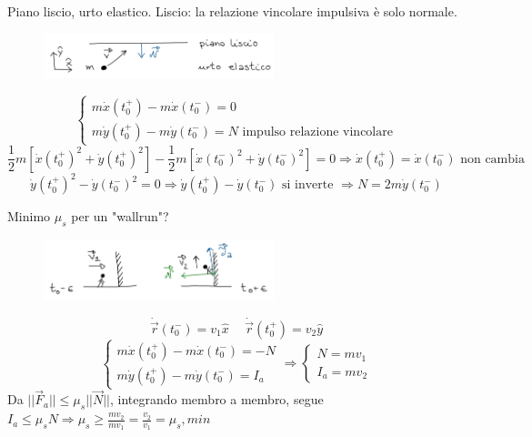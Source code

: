 \begin{example}
    Piano liscio, urto elastico. Liscio: la relazione vincolare impulsiva è solo normale.
    \begin{figure}[h!]
        \centering
        \includegraphics[width=0.6\textwidth]{images/ess-piano-liscio-urto-elastico.png}
    \end{figure}
    $$\begin{cases}
        m\dot{x}(t_0^+) - m\dot{x}(t_0^-) = 0\\
        m\dot{y}(t_0^+) - m\dot{y}(t_0^-) = N \text{ impulso relazione vincolare}
    \end{cases}$$
    $$\frac{1}{2}m[\dot{x}(t_0^+)^2 + \dot{y}(t_0^+)^2] - \frac{1}{2}m[\dot{x}(t_0^-)^2 + \dot{y}(t_0^-)^2] = 0 \Rightarrow \dot{x}(t_0^+) = \dot{x}(t_0^-) \text{ non cambia }$$
    $$\dot{y}(t_0^+)^2 - \dot{y}(t_0^-)^2 = 0 \Rightarrow \dot{y}(t_0^+) - \dot{y}(t_0^-) \text{ si inverte } \Rightarrow N = 2m\dot{y}(t_0^-)$$
\end{example}
\begin{example}
    Minimo $\mu_s$ per un "wallrun"?
    \begin{figure}[h!]
        \centering
        \includegraphics[width=0.6\textwidth]{images/ess-wallrun.png}
    \end{figure}
    $$\dot{\vec{r}}(t_0^-) = v_1 \hat{x} \hspace{15pt} \dot{\vec{r}}(t_0^+) = v_2\hat{y}$$
    $$
    \begin{cases}
        m\dot{x}(t_0^+) - m\dot{x}(t_0^-) = -N\\
        m\dot{y}(t_0^+) - m\dot{y}(t_0^-) = I_a
    \end{cases}
    \Rightarrow
    \begin{cases}
        N = mv_1 \\
        I_a = mv_2
    \end{cases}
    $$
    Da $||\vec{F}_a|| \leq \mu_s||\vec{N}||$, integrando membro a membro, segue $I_a \leq \mu_s N \Rightarrow \mu_s \geq \frac{mv_2}{mv_1} = \frac{v_2}{v_1} = \mu_s,min$
\end{example}

